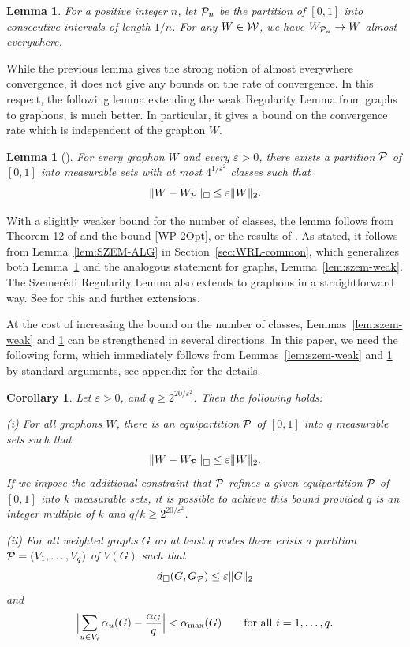 \documentclass[12pt]{article}
\newtheorem{lemma}[theorem]{Lemma}
\newtheorem{corollary}[theorem]{Corollary}
\numberwithin{equation}{section}
\def\eps{\varepsilon}
\def\PP{{\cal P}}\def\QQ{{\cal Q}}\def\RR{{\cal R}}
\begin{document}
\begin{lemma}
\label{lem:as-approx} For a positive integer $n$, let $\PP_n$ be the
partition of $[0,1]$ into consecutive intervals of length $1/n$. For
any $W\in{\cal W}$, we have $W_{\PP_n}\to W$ almost everywhere.
\end{lemma}

While the previous lemma gives the strong notion of almost everywhere
convergence, it does not give any bounds on the rate of convergence.
In this respect, the following lemma extending the weak Regularity
Lemma from graphs to graphons, is much better. In particular, it
gives a bound on the convergence rate which is independent of the
graphon $W$.

\begin{lemma}[\cite{FK}]\label{lem:W-szem}
For every graphon $W$ and every $\eps>0$, there exists a partition
$\PP$ of $[0,1]$ into measurable sets with at most
$4^{1/\eps^2}$
classes such that
\[
\|W-W_\PP\|_\square\le\eps\|W\|_2.
\]
\end{lemma}

With a slightly weaker bound for the number of classes, the lemma
follows from Theorem 12 of \cite{FK} and the bound \eqref{WP-2Opt},
or the results of \cite{LSz3}. As stated, it follows from
Lemma~\ref{lem:SZEM-ALG} in Section~\ref{sec:WRL-common}, which
generalizes both Lemma~\ref{lem:W-szem} and the analogous statement
for graphs, Lemma~\ref{lem:szem-weak}. The
Szemer\'edi Regularity Lemma \cite{Szem} also extends to
graphons in a straightforward way. See \cite{LSz3} for this and
further extensions.

At the cost of increasing the  bound on the number of classes,
Lemmas~\ref{lem:szem-weak} and \ref{lem:W-szem} can be strengthened
in several directions. In this paper, we need the following form,
which immediately follows from Lemmas~\ref{lem:szem-weak} and
\ref{lem:W-szem} by standard arguments,
see appendix for the details.


\begin{corollary}\label{cor:unif-Sem}
Let $\eps>0$, and $q\geq  2^{20/\eps^2}$. Then the following holds:

\smallskip

{\rm (i)} For all graphons $W$, there is an equipartition $\PP$ of
$[0,1]$ into $q$
measurable sets such that
\[
\|W-W_\PP\|_\square\leq \eps\|W\|_2.
\]
If we impose the additional constraint that $\PP$ refines a given
equipartition $\tilde\PP$ of $[0,1]$ into $k$ measurable sets,
it is possible to achieve this  bound provided $q$ is an integer
multiple of $k$ and $q/k\geq 2^{20/\eps^2}$.

\smallskip

{\rm (ii)} For all weighted graphs $G$ on at least $q$ nodes there
exists a partition $\PP=(V_1,\dots,V_q)$ of $V(G)$ such that
\[
d_\square(G,G_\PP)\leq \eps\|G\|_{2}
\]
and
\begin{equation}
\label{weight-cond} \Bigl|\sum_{u\in V_i}\alpha_u(G)-\frac
{\alpha_G}q\Bigr| <\alpha_{\max}(G) \qquad\text{for all
$i=1,\dots,q$}.
\end{equation}
\end{corollary}
\end{document}
